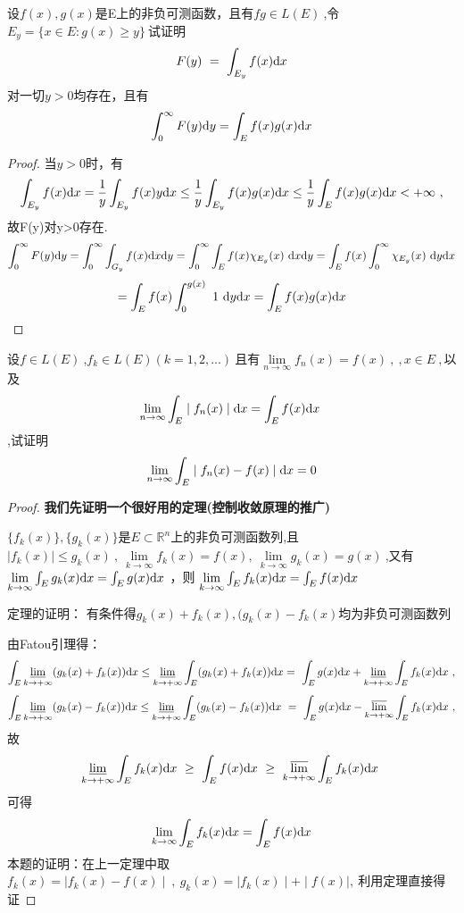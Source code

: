设$f(x),g(x)$是E上的非负可测函数，且有$fg\in L(E)\ $,令$E_y=\{x\in E:g(x)\geq y\}\ $试证明$$F(y)\ =\ \int_{E_y}f(x) \mathrm{d}x $$对一切$y>0$均存在，且有$$\int_{0}^{\infty}F(y)\mathrm{d}y=\int_E f(x)g(x)\mathrm{d}x$$
\begin{proof}
	当$y>0$时，有$$\int_{E_y}f(x)\di{x}=\frac{1}{y}\int_{E_y}f(x)y\di{x}\leq\frac{1}{y}\int_{E_y}f(x)g(x)\di{x}\leq\frac{1}{y}\int_{E}f(x)g(x)\di{x}<+\infty\ ,$$故F(y)对y>0存在.
	$$\int_{0}^{\infty}F(y)\di{y}=\int_{0}^{\infty}\int_{G_y}f(x)\di{x}\di{y}=\int_{0}^{\infty}\int_{E}f(x)\chi_{E_y}(x)\ \di{x}\di{y}=\int_{E}f(x)\int_{0}^{\infty}\chi_{E_y}(x)\ \di{y}\di{x}$$$$=\int_{E}f(x)\int_{0}^{g(x)}\ 1\ \di{y}\di{x}=\int_Ef(x)g(x)\di{x}$$
\end{proof}



设$f\in L(E) \ $,$f_k\in L(E)(k=1,2,...)\ $且有$\lim\limits_{n \to \infty}f_n(x)=f(x)\ ,\ ,x\in E\ ,$以及$$\lim\limits_{n \to \infty}\int_E \mid f_n(x)\mid \mathrm{d}x=\int_E f(x)\mathrm{d}x\ $$,试证明$$\lim\limits_{n \to \infty}\int_E \mid f_n(x)-f(x)\mid \mathrm{d}x=0$$
\begin{proof}
	\textbf{我们先证明一个很好用的定理(控制收敛原理的推广)}\par
	$\{f_k(x)\},\{g_k(x)\}$是$E \subset \mathbb{R}^n$上的非负可测函数列,且$\mid f_k(x) \mid \leq g_k(x)\ ,\ \lim\limits_{k \to \infty}f_k(x)=f(x),\ \lim\limits_{k \to \infty}g_k(x)=g(x)\ $,又有$\lim\limits_{k \to \infty}\int_E g_k(x)\mathrm{d}x=\int_E g(x)\mathrm{d}x\ $，则$\ \lim\limits_{k \to \infty}\int_E f_k(x)\di{x}=\int_E f(x)\di{x}\ $\par
	定理的证明： 	有条件得$g_k(x)+f_k(x),(g_k(x)-f_k(x)$均为非负可测函数列\par
	由Fatou引理得：
	$$\int_E \varliminf_{k \to +\infty}(g_k(x)+f_k(x))\mathrm{d}x\leq \varliminf_{k \to +\infty}\int_E (g_k(x)+f_k(x))\mathrm{d}x=\ \int_E g(x)\mathrm{d}x+\varliminf_{k \to +\infty}\int_E f_k(x)\mathrm{d}x\ ,$$  
	$$\int_E \varliminf_{k \to +\infty}(g_k(x)-f_k(x))\mathrm{d}x\leq \varliminf_{k \to +\infty}\int_E (g_k(x)-f_k(x))\mathrm{d}x\ =\ \int_E g(x)\mathrm{d}x-\varlimsup_{k \to +\infty}\int_E f_k(x)\mathrm{d}x\ ,$$
	故$$\varliminf_{k \to +\infty}\int_E f_k(x)\di{x}\ \geq\  \int_E f(x)\di{x}\ \geq\ \varlimsup_{k \to +\infty}\int_E f_k(x)\di{x}\ $$
	可得$$\ \lim\limits_{k \to \infty}\int_E f_k(x)\di{x}=\int_E f(x)\di{x}\ $$
	本题的证明：在上一定理中取$f_k(x)=\mid f_k(x)-f(x)\mid\ ,\ g_k(x)=\mid f_k(x)\mid+\mid f(x)\mid,\ $利用定理直接得证	
\end{proof}